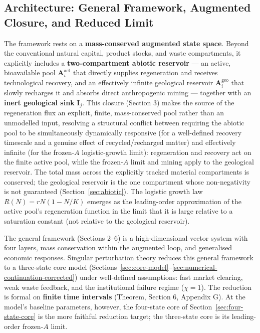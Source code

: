 \documentclass[twocolumn,10pt]{article}
\begin{document}
\subsection{Architecture: General Framework, Augmented Closure, and Reduced Limit}
The framework rests on a \textbf{mass-conserved augmented state space}. Beyond the conventional natural capital, product stocks, and waste compartments, it explicitly includes a \textbf{two-compartment abiotic reservoir} — an active, bioavailable pool \(\mathbf{A}^{\text{act}}_i\) that directly supplies regeneration and receives technological recovery, and an effectively infinite geological reservoir \(\mathbf{A}^{\text{geo}}_i\) that slowly recharges it and absorbs direct anthropogenic mining — together with an \textbf{inert geological sink} \(\mathbf{I}_j\). This closure (Section 3) makes the source of the regeneration flux an explicit, finite, mass-conserved pool rather than an unmodelled input, resolving a structural conflict between requiring the abiotic pool to be simultaneously dynamically responsive (for a well-defined recovery timescale and a genuine effect of recycled/recharged matter) and effectively infinite (for the frozen-$A$ logistic-growth limit): regeneration and recovery act on the finite active pool, while the frozen-$A$ limit and mining apply to the geological reservoir. The total mass across the explicitly tracked material compartments is conserved; the geological reservoir is the one compartment whose non-negativity is not guaranteed (Section~\ref{sec:abiotic}). The logistic growth law \(R(N) = rN(1-N/K)\) emerges as the leading-order approximation of the active pool's regeneration function in the limit that it is large relative to a saturation constant (not relative to the geological reservoir).

The general framework (Sections 2--6) is a high-dimensional vector system with four layers, mass conservation within the augmented loop, and generalised economic responses. Singular perturbation theory reduces this general framework to a three-state core model (Sections~\ref{sec:core-model}--\ref{sec:numerical-continuation-corrected}) under well-defined assumptions: fast market clearing, weak waste feedback, and the institutional failure regime (\(\chi=1\)). The reduction is formal on \textbf{finite time intervals} (Theorem, Section 6, Appendix G). At the model's baseline parameters, however, the four-state core of Section~\ref{sec:four-state-core} is the more faithful reduction target; the three-state core is its leading-order frozen-$A$ limit.
\end{document}
